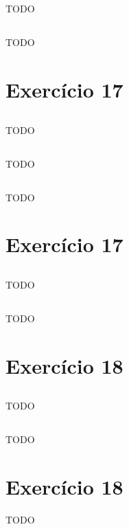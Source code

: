 \documentclass{article}
\begin{document}
\subsection{}
TODO
\subsection{}
TODO

\section{Exercício 17}
\subsection{}
TODO
\subsection{}
TODO
\subsection{}
TODO

\section{Exercício 17}
\subsection{}
TODO
\subsection{}
TODO

\section{Exercício 18}
\subsection{}
TODO
\subsection{}
TODO

\section{Exercício 18}
TODO
\end{document}

